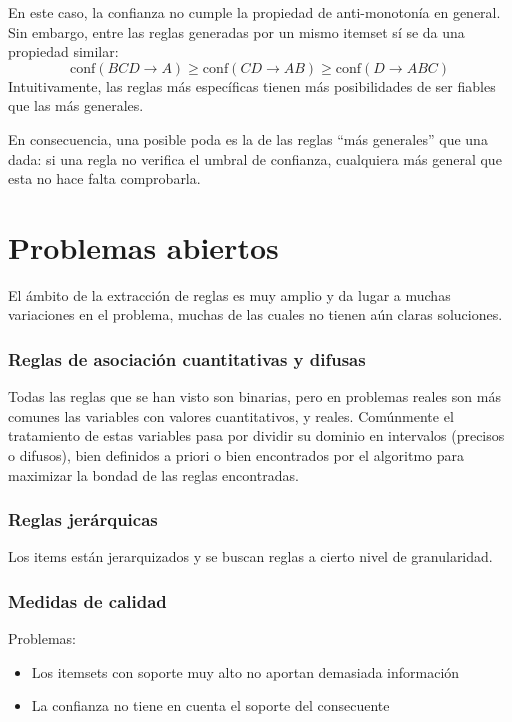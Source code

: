 \documentclass[a4paper,11pt,spanish]{report}
\let\stdsection\section
\let\stdsub\subsection
\let\stdsubsub\subsubsection
\renewcommand{\chapter}{\stdsection}
\renewcommand{\section}{\stdsub}
\renewcommand{\subsection}{\stdsubsub}
\begin{document}
En este caso, la confianza no cumple la propiedad de anti-monotonía en general. Sin embargo, entre las reglas generadas por un mismo itemset sí se da una propiedad similar:
$$\mathrm{conf}(BCD\rightarrow A)\geq \mathrm{conf}(CD\rightarrow AB)\geq \mathrm{conf}(D\rightarrow ABC)$$
Intuitivamente, las reglas más específicas tienen más posibilidades de ser fiables que las más generales.

En consecuencia, una posible poda es la de las reglas ``más generales'' que una dada: si una regla no verifica el umbral de confianza, cualquiera más general que esta no hace falta comprobarla.

\chapter{Problemas abiertos}
\label{sec-3-6}

El ámbito de la extracción de reglas es muy amplio y da lugar a muchas variaciones en el problema, muchas de las cuales no tienen aún claras soluciones. 

\subsection*{Reglas de asociación cuantitativas y difusas}
\label{sec-3-6-0-1}

Todas las reglas que se han visto son binarias, pero en problemas reales son más comunes las variables con valores cuantitativos, y reales. Comúnmente el tratamiento de estas variables pasa por dividir su dominio en intervalos (precisos o difusos), bien definidos a priori o bien encontrados por el algoritmo para maximizar la bondad de las reglas encontradas.

\subsection*{Reglas jerárquicas}
\label{sec-3-6-0-2}

Los items están jerarquizados y se buscan reglas a cierto nivel de granularidad.

\subsection*{Medidas de calidad}
\label{sec-3-6-0-3}

Problemas:
\begin{itemize}
\item Los itemsets con soporte muy alto no aportan demasiada información
\item La confianza no tiene en cuenta el soporte del consecuente
\end{itemize}
\end{document}
